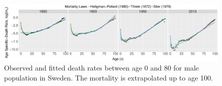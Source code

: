 \documentclass[a0,portrait]{a0poster}\usepackage[]{graphicx}\usepackage[]{color}
\makeatletter
\def\maxwidth{ %
  \ifdim\Gin@nat@width>\linewidth
    \linewidth
  \else
    \Gin@nat@width
  \fi
}
\newenvironment{knitrout}{}{} %
\makeatother
\begin{document}
\begin{knitrout}
\color{fgcolor}\begin{figure}[!b]

{\centering \includegraphics[width=\maxwidth]{figure/gg_full-1} 

}

\caption[Observed and fitted death rates between age 0 and 80 for male population in Sweden]{Observed and fitted death rates between age 0 and 80 for male population in Sweden. The mortality is extrapolated up to age 100.}\label{fig:gg_full}
\end{figure}


\end{knitrout}
\end{document}

